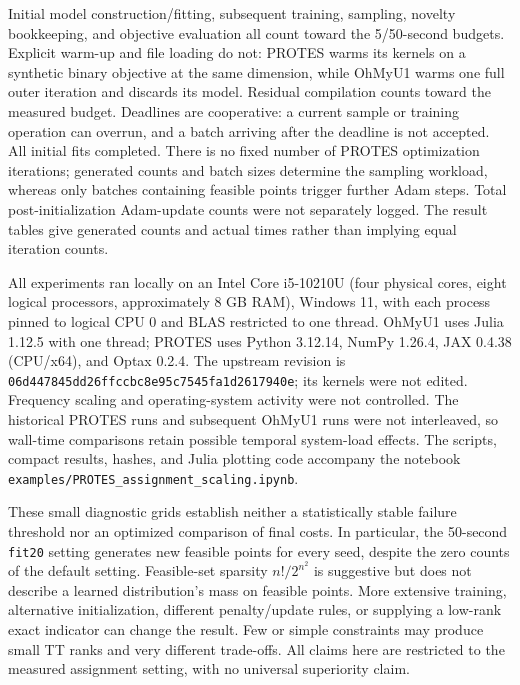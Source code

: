 Initial model construction/fitting, subsequent training, sampling, novelty
bookkeeping, and objective evaluation all count toward the 5/50-second
budgets. Explicit warm-up and file loading do not: PROTES warms its kernels
on a synthetic binary objective at the same dimension, while OhMyU1 warms
one full outer iteration and discards its model. Residual compilation counts
toward the measured budget. Deadlines are cooperative: a current sample or
training operation can overrun, and a batch arriving after the deadline is
not accepted. All initial fits completed. There is no fixed number of
PROTES optimization iterations; generated counts and batch sizes determine
the sampling workload, whereas only batches containing feasible points
trigger further Adam steps. Total post-initialization Adam-update counts
were not separately logged. The result tables give generated counts and
actual times rather than implying equal iteration counts.

All experiments ran locally on an Intel Core i5-10210U (four physical cores,
eight logical processors, approximately 8 GB RAM), Windows 11, with each
process pinned to logical CPU 0 and BLAS restricted to one thread. OhMyU1
uses Julia 1.12.5 with one thread; PROTES uses Python 3.12.14, NumPy 1.26.4,
JAX 0.4.38 (CPU/x64), and Optax 0.2.4. The upstream revision is
\texttt{06d447845dd26ffccbc8e95c7545fa1d2617940e}; its kernels were not edited.
Frequency scaling and operating-system activity were not controlled.
The historical PROTES runs and subsequent OhMyU1 runs were not interleaved,
so wall-time comparisons retain possible temporal system-load effects.
The scripts, compact results, hashes, and Julia plotting code accompany
the notebook \texttt{examples/PROTES\_assignment\_scaling.ipynb}.


These small diagnostic grids establish neither a statistically stable failure
threshold nor an optimized comparison of final costs. In particular, the
50-second \texttt{fit20} setting generates new feasible points for every seed,
despite the zero counts of the default setting. Feasible-set sparsity
$n!/2^{n^2}$ is suggestive but does not describe a learned distribution's
mass on feasible points. More extensive training, alternative initialization,
different penalty/update rules, or supplying a low-rank exact indicator can
change the result. Few or simple constraints may produce small TT ranks and
very different trade-offs. All claims here are restricted to the measured
assignment setting, with no universal superiority claim.
